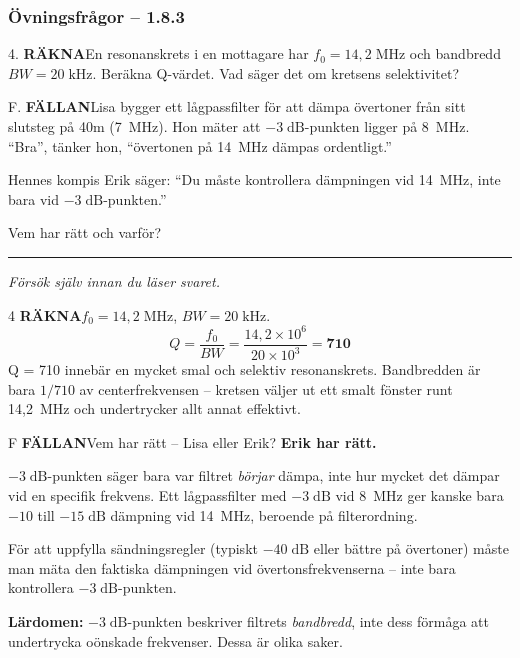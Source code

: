\documentclass[a4paper,11pt,twoside]{book}
\newcommand{\qrakna}{\colorbox{bluepale}{\textcolor{bluedark}{\headingfont\bfseries\tiny RÄKNA}}}
\newcommand{\qfallan}{\colorbox{ljusbrun}{\textcolor{kakao}{\headingfont\bfseries\tiny FÄLLAN}}}
\begin{document}
\subsubsection*{Övningsfrågor -- 1.8.3}

\begin{qblock}{4.}
\qrakna\quad En resonanskrets i en mottagare har
$f_0 = 14{,}2\;\text{MHz}$ och bandbredd $BW = 20\;\text{kHz}$.
Beräkna Q-värdet. Vad säger det om kretsens selektivitet?
\end{qblock}

\begin{qblock}{F.}
\qfallan\quad Lisa bygger ett lågpassfilter för att dämpa övertoner
från sitt slutsteg på 40m (7~MHz). Hon mäter att
$-3\;\text{dB}$-punkten ligger på 8~MHz.
``Bra'', tänker hon, ``övertonen på 14~MHz dämpas ordentligt.''

Hennes kompis Erik säger: ``Du måste kontrollera dämpningen vid
14~MHz, inte bara vid $-3\;\text{dB}$-punkten.''

Vem har rätt och varför?
\end{qblock}

\medskip
\noindent\rule{\textwidth}{0.4pt}
{\small\itshape Försök själv innan du läser svaret.}
\medskip

\begin{facitblock}{4}
\qrakna\quad $f_0 = 14{,}2\;\text{MHz}$, $BW = 20\;\text{kHz}$.
\tcblower
\[
Q = \frac{f_0}{BW}
  = \frac{14{,}2 \times 10^6}{20 \times 10^3}
  = \mathbf{710}
\]
Q = 710 innebär en mycket smal och selektiv resonanskrets.
Bandbredden är bara $1/710$ av centerfrekvensen -- kretsen
väljer ut ett smalt fönster runt 14,2~MHz och undertrycker
allt annat effektivt.
\end{facitblock}

\begin{facitblock}{F}
\qfallan\quad Vem har rätt -- Lisa eller Erik?
\tcblower
\textbf{Erik har rätt.}

$-3\;\text{dB}$-punkten säger bara var filtret \emph{börjar}
dämpa, inte hur mycket det dämpar vid en specifik frekvens.
Ett lågpassfilter med $-3\;\text{dB}$ vid 8~MHz ger kanske
bara $-10$ till $-15\;\text{dB}$ dämpning vid 14~MHz,
beroende på filterordning.

För att uppfylla sändningsregler (typiskt $-40\;\text{dB}$
eller bättre på övertoner) måste man mäta den faktiska
dämpningen vid övertonsfrekvenserna -- inte bara kontrollera
$-3\;\text{dB}$-punkten.

\textbf{Lärdomen:} $-3\;\text{dB}$-punkten beskriver filtrets
\emph{bandbredd}, inte dess förmåga att undertrycka oönskade
frekvenser. Dessa är olika saker.
\end{facitblock}
\end{document}
